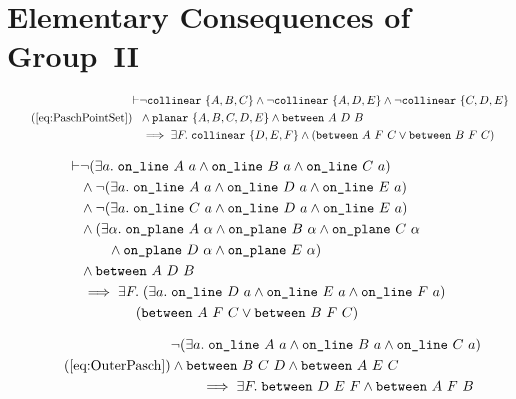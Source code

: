 \chapter{Elementary Consequences of Group~II}\label{app:Group2}

\begin{equation}
    \tag{\ref{eq:PaschPointSet}}
  \begin{aligned}
    \vdash&\neg\code{collinear}\ \{A,B,C\}\wedge\neg\code{collinear}\ \{A,D,E\}\wedge\neg\code{collinear}\ \{C,D,E\}\\
    &\wedge\code{planar}\ \{A,B,C,D,E\}\wedge\between{A}{D}{B}\\
    &\implies\exists F.\; \code{collinear}\ \{D,E,F\} \wedge (\between{A}{F}{C}\vee\between{B}{F}{C})
  \end{aligned} 
\end{equation}

\begin{equation}\label{eq:PaschPointSetUnfold}
  \begin{split}
    \vdash&\neg(\exists a.\; \texttt{on\_line}\ A\ a\wedge \texttt{on\_line}\ B\ a\wedge \texttt{on\_line}\ C\ a)\\
    &\wedge\neg(\exists a.\; \texttt{on\_line}\ A\ a\wedge \texttt{on\_line}\ D\ a\wedge \texttt{on\_line}\ E\ a)\\
    &\wedge\neg(\exists a.\; \texttt{on\_line}\ C\ a\wedge \texttt{on\_line}\ D\ a\wedge \texttt{on\_line}\ E\ a)\\
    &\wedge(\exists\alpha.\; \texttt{on\_plane}\ A\ \alpha\wedge \texttt{on\_plane}\ B\ \alpha\wedge \texttt{on\_plane}\ C\ \alpha\\
    &\qquad\wedge \texttt{on\_plane}\ D\ \alpha\wedge \texttt{on\_plane}\ E\ \alpha)\\
    &\wedge\texttt{between}\ A\ D\ B\\
    &\implies\exists F.\; (\exists a.\; \texttt{on\_line}\ D\ a\wedge \texttt{on\_line}\ E\ a\wedge \texttt{on\_line}\ F\ a)\\
    &\qquad\qquad (\texttt{between}\ A\ F\ C\vee\texttt{between}\ B\ F\ C)
  \end{split}
\end{equation}

\begin{equation}
  \tag{\ref{eq:OuterPasch}}
  \begin{split}
    &\Triangle{a}{A}{B}{C}\\ & \wedge \between{B}{C}{D} \wedge \between{A}{E}{C}\\ 
    &\qquad\implies \exists F.\; \between{D}{E}{F} \wedge \between{A}{F}{B}
  \end{split}
\end{equation}

